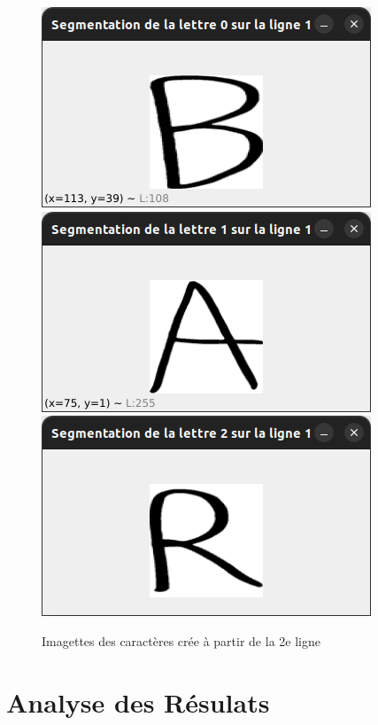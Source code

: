 \documentclass[a4paper]{article}
\begin{document}
			\begin{figure}
				\caption{Imagettes des caractères crée à partir de la 2e ligne}
				\includegraphics[scale=.3]{segmentation_B.png}
				\centering
				\includegraphics[scale=.3]{segmentation_A.png}
				\centering
				\includegraphics[scale=.3]{segmentation_R.png}
				\centering
			\end{figure}
	\newpage
	\section{Analyse des Résulats}
\end{document}
